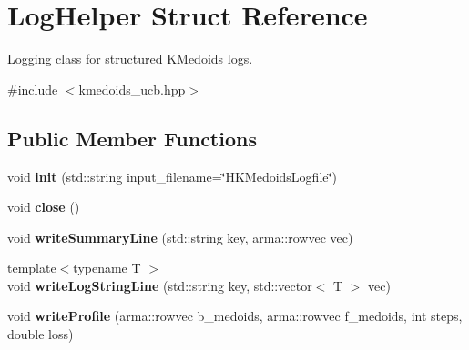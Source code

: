 \hypertarget{structLogHelper}{}\section{Log\+Helper Struct Reference}
\label{structLogHelper}


Logging class for structured \hyperlink{classKMedoids}{K\+Medoids} logs.  




{\ttfamily \#include $<$kmedoids\+\_\+ucb.\+hpp$>$}

\subsection*{Public Member Functions}
\begin{DoxyCompactItemize}
\item 
\mbox{\label{structLogHelper_a0cbf766b210cc27f71bf309b42922ac8}} 
void {\bfseries init} (std\+::string input\+\_\+filename=\char`\"{}H\+K\+Medoids\+Logfile\char`\"{})
\item 
\mbox{\label{structLogHelper_a4624149f53c4577d0565f761c155d800}} 
void {\bfseries close} ()
\item 
\mbox{\label{structLogHelper_a5b1a8ff2ae2ce6e3293e3b34085e3b86}} 
void {\bfseries write\+Summary\+Line} (std\+::string key, arma\+::rowvec vec)
\item 
\mbox{\label{structLogHelper_ad1bb80fa2bd8b1dfcd944ea19c4e8e06}} 
{\footnotesize template$<$typename T $>$ }\\void {\bfseries write\+Log\+String\+Line} (std\+::string key, std\+::vector$<$ T $>$ vec)
\item 
\mbox{\label{structLogHelper_a15b3f49bf98956a0585f036801e25dbe}} 
void {\bfseries write\+Profile} (arma\+::rowvec b\+\_\+medoids, arma\+::rowvec f\+\_\+medoids, int steps, double loss)
\end{DoxyCompactItemize}
